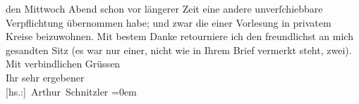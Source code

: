 \begin{ledgroupsized}[t]{13cm}
               den Mittwoch{ }Abend schon vor längerer Zeit eine andere \introOben{}unverſchiebbare\introOben{} Verpflichtung übernommen habe\introOben{};\introOben{}
               und zwar die einer Vorlesung in privatem Kreise beizuwohnen.\pend
           \pstart
           {\pb}Mit bestem Danke retourniere ich den freundlichst
               an mich gesandten Sitz (es war nur einer, nicht wie in Ihrem Brief vermerkt steht,
               zwei).\pend
           \pstart
           Mit verbindlichen Grüssen{\\[\baselineskip]}Ihr sehr ergebener{\\[\baselineskip]}\spacefill\mbox{{[}hs.:{]} Arthur Schnitzler}\pend
           \leftskip=0em{}
         
         \endnumbering{}\end{ledgroupsized}  \newcommand{\dateiname}{L02322}\newcommand{\titel}{Arthur Schnitzler an Georg Engländer, 3. 3. 1919}\newcommand{\editorInnen}{Martin Anton Müller und Gerd-Hermann Susen}
      